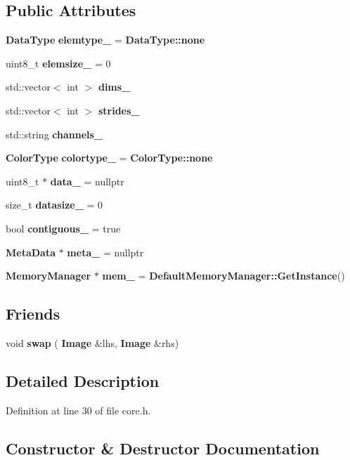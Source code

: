 \subsection*{Public Attributes}
\begin{DoxyCompactItemize}
\item 
\textbf{ Data\+Type} \textbf{ elemtype\+\_\+} = \textbf{ Data\+Type\+::none}
\item 
uint8\+\_\+t \textbf{ elemsize\+\_\+} = 0
\item 
std\+::vector$<$ int $>$ \textbf{ dims\+\_\+}
\item 
std\+::vector$<$ int $>$ \textbf{ strides\+\_\+}
\item 
std\+::string \textbf{ channels\+\_\+}
\item 
\textbf{ Color\+Type} \textbf{ colortype\+\_\+} = \textbf{ Color\+Type\+::none}
\item 
uint8\+\_\+t $\ast$ \textbf{ data\+\_\+} = nullptr
\item 
size\+\_\+t \textbf{ datasize\+\_\+} = 0
\item 
bool \textbf{ contiguous\+\_\+} = true
\item 
\textbf{ Meta\+Data} $\ast$ \textbf{ meta\+\_\+} = nullptr
\item 
\textbf{ Memory\+Manager} $\ast$ \textbf{ mem\+\_\+} = \textbf{ Default\+Memory\+Manager\+::\+Get\+Instance}()
\end{DoxyCompactItemize}
\subsection*{Friends}
\begin{DoxyCompactItemize}
\item 
void \textbf{ swap} (\textbf{ Image} \&lhs, \textbf{ Image} \&rhs)
\end{DoxyCompactItemize}


\subsection{Detailed Description}


Definition at line 30 of file core.\+h.



\subsection{Constructor \& Destructor Documentation}
\mbox{\label{classecvl_1_1_image_a6102d86ab9b3eb71552dddd6536dfe8b}} 
